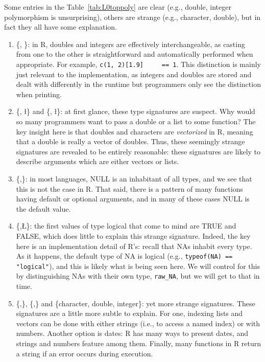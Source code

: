 \documentclass[acmsmall,10pt,review,anonymous]{acmart}\settopmatter{printfolios=true,printccs=false,printacmref=false}
\newcommand{\code}[1]{\lstinline|#1|\xspace}
\begin{document}
Some entries in the Table~\ref{tab:L0toppoly} are clear (e.g., double,
integer polymorphism is unsurprising), others are strange (e.g., character,
double), but in fact they all have some explanation.

\begin{enumerate}
\item \{\D, \I\}: in R, doubles and integers are effectively
  interchangeable, as casting from one to the other is straightforward and
  automatically performed when appropriate.  For example, \code{c(1, 2)[1.9]
    == 1}.  This distinction is mainly just relevant to the implementation,
  as integers and doubles are stored and dealt with differently in the
  runtime but programmers only see the distinction when printing.

\item \{\D, \l\} and \{\C, \l\}: at first glance, these type signatures are
  suspect.  Why would so many programmers want to pass a double or a list to
  some function?  The key insight here is that doubles and characters are
  {\it vectorized} in R, meaning that a double is really a vector of
  doubles.  Thus, these seemingly strange signatures are revealed to be
  entirely reasonable: these signatures are likely to describe arguments
  which are either vectors or lists.

\item \{\ANY,\sN\}: in most languages, NULL is an inhabitant of all types,
  and we see that this is not the case in R.  That said, there is a pattern
  of many functions having default or optional arguments, and in many of
  these cases NULL is the default value.

\item \{\D,\L\}: the first values of type logical that come to mind are TRUE
  and FALSE, which does little to explain this strange signature.  Indeed,
  the key here is an implementation detail of R's: recall that NAs inhabit
  every type.  As it happens, the default type of NA is logical (e.g.,
  \code{typeof(NA) == "logical"}), and this is likely what is being seen
  here.  We will control for this by distinguishing NAs with their own type,
  {\tt raw\_NA}, but we will get to that in time.

\item \{\C,\D\}, \{\C,\I\} and \{character, double, integer\}: yet more
  strange signatures.  These signatures are a little more subtle to explain.
  For one, indexing lists and vectors can be done with either strings (i.e.,
  to access a named index) or with numbers.  Another option is dates: R has
  many ways to present dates, and strings and numbers feature among them.
  Finally, many  functions in R return a string if an error
  occurs during execution.

\end{enumerate}
\end{document}
